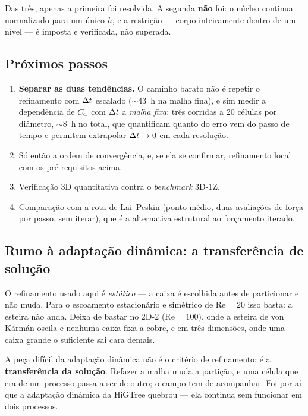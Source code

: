 Das três, apenas a primeira foi resolvida. A segunda \textbf{não} foi: o núcleo
continua normalizado para um único $h$, e a restrição --- corpo inteiramente
dentro de um nível --- é imposta e verificada, não superada.

\subsection{Próximos passos}

\begin{enumerate}
  \item \textbf{Separar as duas tendências.} O caminho barato não é repetir o
        refinamento com $\Delta t$ escalado ($\sim$43~h na malha fina), e sim medir a
        dependência de $C_{\mathrm{d}}$ com $\Delta t$ a \emph{malha fixa}: três corridas a 20
        células por diâmetro, $\sim$8~h no total, que quantificam quanto do erro
        vem do passo de tempo e permitem extrapolar $\Delta t \to 0$ em cada
        resolução.
  \item Só então a ordem de convergência, e, se ela se confirmar, refinamento
        local com os pré-requisitos acima.
  \item Verificação 3D quantitativa contra o \emph{benchmark} 3D-1Z.
  \item Comparação com a rota de Lai--Peskin (ponto médio, duas avaliações de
        força por passo, sem iterar), que é a alternativa estrutural ao
        forçamento iterado.
\end{enumerate}

\subsection{Rumo à adaptação dinâmica: a transferência de solução}

O refinamento usado aqui é \emph{estático} --- a caixa é escolhida antes de
particionar e não muda. Para o escoamento estacionário e simétrico de
$\mathrm{Re}=20$ isso basta: a esteira não anda. Deixa de bastar no 2D-2
($\mathrm{Re}=100$), onde a esteira de von Kármán oscila e nenhuma caixa fixa a
cobre, e em três dimensões, onde uma caixa grande o suficiente sai cara demais.

A peça difícil da adaptação dinâmica não é o critério de refinamento: é a
\textbf{transferência da solução}. Refazer a malha muda a partição, e uma célula
que era de um processo passa a ser de outro; o campo tem de acompanhar. Foi por
aí que a adaptação dinâmica da HiGTree quebrou --- ela continua sem funcionar em
dois processos.

